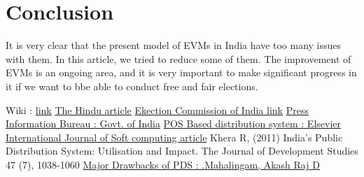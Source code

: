 \documentclass{article}
\begin{document}
\section{Conclusion}
It is very clear that the present model of EVMs in India have too many issues with them. In this article, we tried to reduce some of them. The improvement of EVMs is an ongoing area, and it is very important to make significant progress in it if we want to bbe able to conduct free and fair elections.

\begin{thebibliography}{99}

 Wiki : \href{https://en.wikipedia.org/wiki/Electronic_voting_in_India}{link}
 \href{http://www.thehindu.com/news/national/a-look-inside-the-electronic-voting-machine/article23036380.ece}{The Hindu article}
 \href{http://eci.nic.in/eci_main1/evm.aspx}{Ekection Commission of India link}
 \href{http://pib.nic.in/newsite/mbErel.aspx?relid=104463}{Press Information Bureau : Govt. of India}
 \href{https://geleservices.com/GEL/Download/RFP-POS%20.pdf}{POS Based distribution system : Elsevier}
 \href{http://www.iraj.in/journal/journal_file/journal_pdf/4-54-140014348501-03.pdf}{International Journal of Soft computing article}
 Khera R, (2011) India's Public Distribution System: Utilisation and Impact. The Journal of Development Studies 47 (7), 1038-1060
 \href{http://www.ijsrd.com/articles/IJSRDV4I90439.pdf}{Major Drawbacks of PDS : .Mahalingam, Akash Raj D}


\end{thebibliography}
\end{document}

